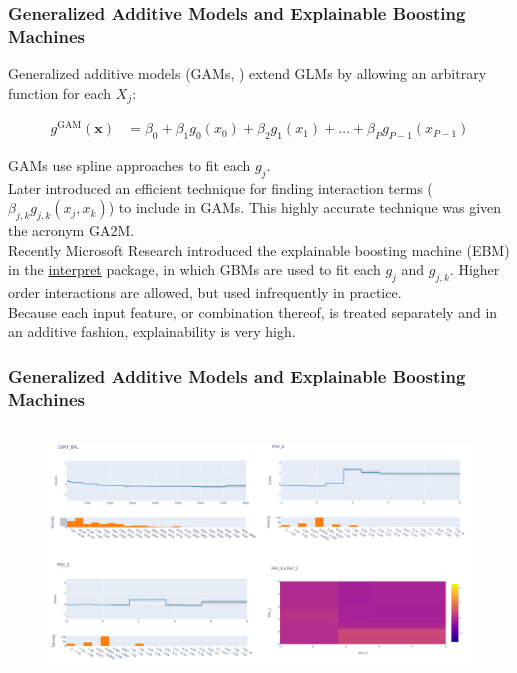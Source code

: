 \documentclass[11pt,aspectratio=169,hyperref={colorlinks}]{beamer}
\begin{document}
	\begin{frame}
		
		\frametitle{Generalized Additive Models and Explainable Boosting Machines}
		
		\small
		
		Generalized additive models (GAMs, \cite{esl}) extend GLMs by allowing an arbitrary function for each $X_j$: 	
		
		\begin{equation}
			\begin{aligned}\label{eq:gam}
			g^{\text{GAM}}(\mathbf{x}) &= \beta_0 + \beta_1 g_0(x_0) + \beta_2 g_1(x_1) + \dots + \beta_P g_{P-1}(x_{P-1})
			\end{aligned}
		\end{equation}	
		
		GAMs use spline approaches to fit each $g_j$.\\
		\vspace{10pt}
		Later \cite{ga2m} introduced an efficient technique for finding interaction terms ($\beta_{j,k} g_{j,k}(x_j, x_k)$) to include in GAMs. This highly accurate technique was given the acronym GA2M.\\
		\vspace{10pt}
		Recently Microsoft Research introduced the explainable boosting machine (EBM) in the \href{https://github.com/interpretml/interpret/}{interpret} package, in which GBMs are used to fit each $g_{j}$ and $g_{j,k}$. Higher order interactions are allowed, but used infrequently in practice. \\
		\vspace{10pt}
		Because each input feature, or combination thereof, is treated separately and in an additive fashion, explainability is very high. 
		
	\end{frame}

	\begin{frame}
	
		\frametitle{Generalized Additive Models and Explainable Boosting Machines}
		
		\begin{figure}[htb]
			\begin{center}
				\includegraphics[height=190pt]{../img/ebm.png}
				\label{fig:ebm}
			\end{center}
		\end{figure}
	
	\end{frame}
\end{document}
